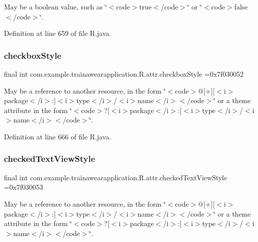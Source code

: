 May be a boolean value, such as \char`\"{}$<$code$>$true$<$/code$>$\char`\"{} or \char`\"{}$<$code$>$false$<$/code$>$\char`\"{}. 

Definition at line 659 of file R.\+java.

\mbox{\label{classcom_1_1example_1_1trainawearapplication_1_1_r_1_1attr_a0ac1c8854a7b3c2e235323928f6666c5}} 
\subsubsection{\texorpdfstring{checkboxStyle}{checkboxStyle}}
{\footnotesize\ttfamily final int com.\+example.\+trainawearapplication.\+R.\+attr.\+checkbox\+Style =0x7f030052\hspace{0.3cm}{\ttfamily [static]}}

May be a reference to another resource, in the form \char`\"{}$<$code$>$@\mbox{[}+\mbox{]}\mbox{[}$<$i$>$package$<$/i$>$\+:\mbox{]}$<$i$>$type$<$/i$>$/$<$i$>$name$<$/i$>$$<$/code$>$\char`\"{} or a theme attribute in the form \char`\"{}$<$code$>$?\mbox{[}$<$i$>$package$<$/i$>$\+:\mbox{]}$<$i$>$type$<$/i$>$/$<$i$>$name$<$/i$>$$<$/code$>$\char`\"{}. 

Definition at line 666 of file R.\+java.

\mbox{\label{classcom_1_1example_1_1trainawearapplication_1_1_r_1_1attr_a1942f5fa7c473f30bb72a4841d881629}} 
\subsubsection{\texorpdfstring{checkedTextViewStyle}{checkedTextViewStyle}}
{\footnotesize\ttfamily final int com.\+example.\+trainawearapplication.\+R.\+attr.\+checked\+Text\+View\+Style =0x7f030053\hspace{0.3cm}{\ttfamily [static]}}

May be a reference to another resource, in the form \char`\"{}$<$code$>$@\mbox{[}+\mbox{]}\mbox{[}$<$i$>$package$<$/i$>$\+:\mbox{]}$<$i$>$type$<$/i$>$/$<$i$>$name$<$/i$>$$<$/code$>$\char`\"{} or a theme attribute in the form \char`\"{}$<$code$>$?\mbox{[}$<$i$>$package$<$/i$>$\+:\mbox{]}$<$i$>$type$<$/i$>$/$<$i$>$name$<$/i$>$$<$/code$>$\char`\"{}. 

